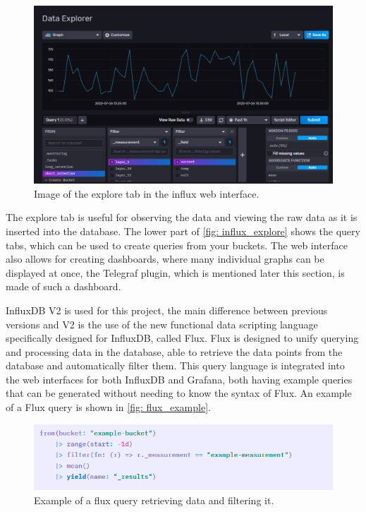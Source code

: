 \documentclass[main.tex]{subfiles}
\begin{document}
\begin{figure}[!htpb]
    \centering
    \includegraphics[width=17cm, scale=4]{images/influx_explore.png}
    \caption{Image of the explore tab in the influx web interface.}
    \label{fig: influx_explore}
\end{figure}
\FloatBarrier

The explore tab is useful for observing the data and viewing the raw data as it is inserted into the database. The lower part of \autoref{fig: influx_explore} shows the query tabs, which can be used to create queries from your buckets. The web interface also allows for creating dashboards, where many individual graphs can be displayed at once, the Telegraf plugin, which is mentioned later this section, is made of such a dashboard.

InfluxDB V2 is used for this project, the main difference between previous versions and V2 is the use of the new functional data scripting language specifically designed for InfluxDB, called Flux. Flux is designed to unify querying and processing data in the database, able to retrieve the data points from the database and automatically filter them. This query language is integrated into the web interfaces for both InfluxDB and Grafana, both having example queries that can be generated without needing to know the syntax of Flux. An example of a Flux query is shown in \autoref{fig: flux_example}.

\begin{figure}[!htpb]
    \centering
    \includegraphics[width=17cm, scale=4]{images/flux_example.png}
    \caption{Example of a flux query retrieving data and filtering it.}
    \label{fig: flux_example}
\end{figure}
\FloatBarrier
\end{document}
